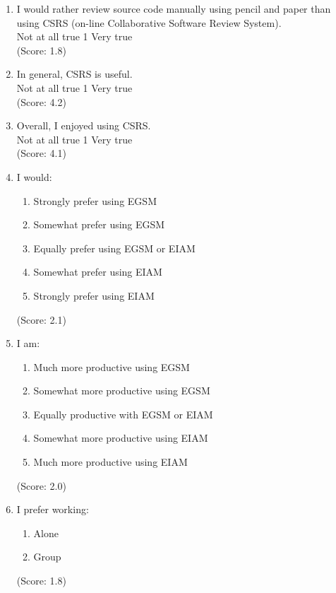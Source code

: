 \begin{enumerate}

\item  I would rather review source code manually using pencil and paper than
using CSRS (on-line Collaborative Software Review System).
\\
Not at all true \hfill 1     \hfill Very true\\
(Score: 1.8)

\item  In general, CSRS is useful.
\\
Not at all true \hfill 1     \hfill Very true\\
(Score: 4.2)

\item  Overall, I enjoyed using CSRS.
\\
Not at all true \hfill 1    
\hfill Very true\\
(Score: 4.1)

\item I would:
   \begin{enumerate}
   \item[(1)]Strongly prefer using EGSM
   \item[(2)]Somewhat prefer using EGSM
   \item[(3)]Equally prefer using EGSM or EIAM
   \item[(4)]Somewhat prefer using EIAM
   \item[(5)]Strongly prefer using EIAM
   \end{enumerate}
(Score: 2.1)

\item I am:
   \begin{enumerate}
     \item[(1)] Much more productive using EGSM
     \item[(2)] Somewhat more productive using EGSM
     \item[(3)] Equally productive with EGSM or EIAM
     \item[(4)] Somewhat more productive using EIAM
     \item[(5)] Much more productive using EIAM
    \end{enumerate}   
(Score: 2.0)

\item  I prefer working:
  \begin{enumerate}
     \item[(1)] Alone 
     \item[(2)] Group
  \end{enumerate} 
(Score: 1.8)


\end{enumerate}
